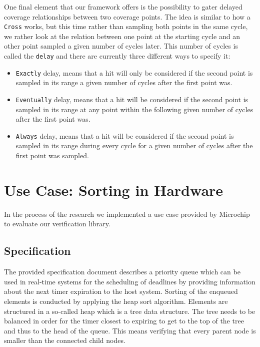 \documentclass[runningheads]{llncs}
\begin{document}
One final element that our framework offers is the possibility to gater delayed coverage relationships between two coverage points. The idea is similar to how a \texttt{Cross} works, but this time rather than sampling both points in the same cycle, we rather look at the relation between one point at the starting cycle and an other point sampled a given number of cycles later. This number of cycles is called the \texttt{delay} and there are currently three different ways to specify it:  
\begin{itemize}
 \item \texttt{Exactly} delay, means that a hit will only be considered if the second point is sampled in its range a given number of cycles after the first point was.
 \item \texttt{Eventually} delay, means that a hit will be considered if the second point is sampled in its range at any point within the following given number of cycles after the first point was.  
 \item \texttt{Always} delay, means that a hit will be considered if the second point is sampled in its range during every cycle for a given number of cycles after the first point was sampled.
\end{itemize}



\section{Use Case: Sorting in Hardware}

In the process of the research we implemented a use case provided by Microchip to evaluate our verification library.

\subsection{Specification}

The provided specification document describes a priority queue which can be used in real-time systems for the scheduling of deadlines by providing information about the 
next timer expiration to the host system. Sorting of the enqueued elements is conducted by applying the heap sort algorithm. Elements are structured in a so-called 
heap which is a tree data structure. The tree needs to be balanced in order for the
timer closest to expiring to get to the top of the tree and thus to the head of the queue. This means verifying that every parent node is smaller than the connected child nodes.
\end{document}
